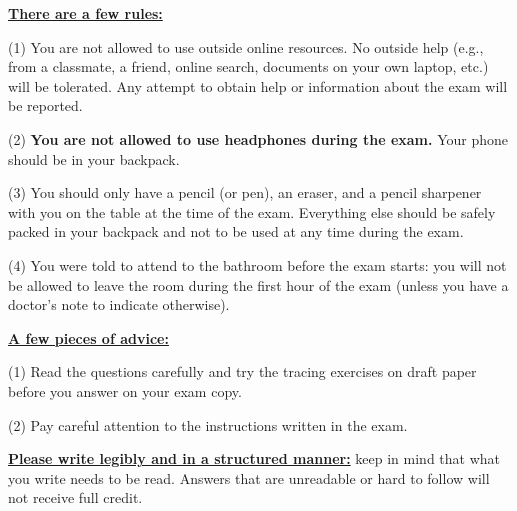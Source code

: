 \documentclass[11pt, oneside]{article}   	%
\begin{document}
\textbf{\underline{There are a few rules:}}

(1) You are not allowed to use outside online resources. 
No outside help (e.g., from a classmate, a friend, online search, documents on your own laptop, etc.) will be tolerated. 
Any attempt to obtain help or information about the exam will be reported.

(2) \textbf{You are not allowed to use headphones during the exam.} Your phone should be in your backpack.

(3) You should only have a pencil (or pen), an eraser, and a pencil sharpener with you on the table at the time of the exam. 
Everything else should be safely packed in your backpack and not to be used at any time during the exam.

(4) You were told to attend to the bathroom before the exam starts: 
you will not be allowed to leave the room during the first hour of the exam (unless you have a doctor’s note to indicate otherwise).

\textbf{\underline{A few pieces of advice:}}

(1) Read the questions carefully and try the tracing exercises on draft paper before you answer on your exam copy.

(2) Pay careful attention to the instructions written in the exam.

\textbf{\underline{Please write legibly and in a structured manner:}} 
keep in mind that what you write needs to be read. Answers that are unreadable or hard to follow will not receive full credit.




\clearpage
\end{document}
